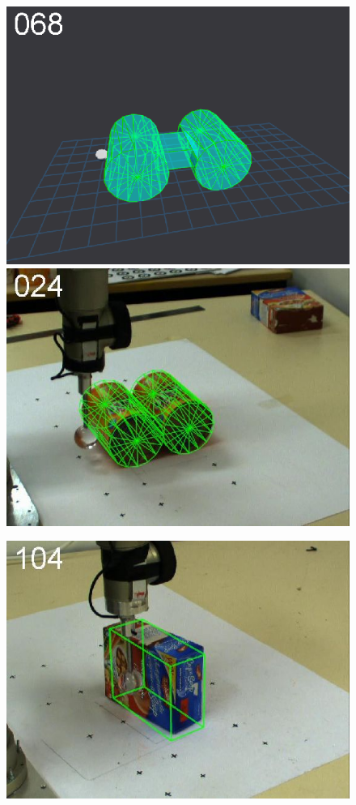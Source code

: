 \begin{figure}[tbp]
{\includegraphics[width=\imgCXwid]{images/C5_3exp_6_1}
\includegraphics[width=\imgCXwid]{images/C2_3exp_75_1}
}
\centerline{
\includegraphics[width=\imgCXwid]{images/C1_2exp_87_2}
}
\end{figure}
